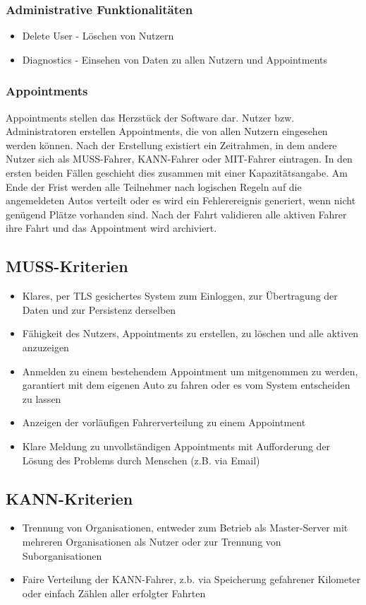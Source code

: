 \documentclass[11pt,a4paper]{article}
\begin{document}
\subsubsection{Administrative Funktionalitäten}
\begin{itemize}
\item Delete User - Löschen von Nutzern
\item Diagnostics - Einsehen von Daten zu allen Nutzern und Appointments
\end{itemize}
\subsubsection{Appointments}
Appointments stellen das Herzstück der Software dar. Nutzer bzw. Administratoren erstellen Appointments, die von allen Nutzern eingesehen werden können. Nach der Erstellung existiert ein Zeitrahmen, in dem andere Nutzer sich als MUSS-Fahrer, KANN-Fahrer oder MIT-Fahrer eintragen. In den ersten beiden Fällen geschieht dies zusammen mit einer Kapazitätsangabe.
Am Ende der Frist werden alle Teilnehmer nach logischen Regeln auf die angemeldeten Autos verteilt oder es wird ein Fehlerereignis generiert, wenn nicht genügend Plätze vorhanden sind.
Nach der Fahrt validieren alle aktiven Fahrer ihre Fahrt und das Appointment wird archiviert.
\subsection{MUSS-Kriterien}
\begin{itemize}
\item Klares, per TLS gesichertes System zum Einloggen, zur Übertragung der Daten und zur Persistenz derselben
\item Fähigkeit des Nutzers, Appointments zu erstellen, zu löschen und alle aktiven anzuzeigen
\item Anmelden zu einem bestehendem Appointment um mitgenommen zu werden, garantiert mit dem eigenen Auto zu fahren oder es vom System entscheiden zu lassen
\item Anzeigen der vorläufigen Fahrerverteilung zu einem Appointment
\item Klare Meldung zu unvollständigen Appointments mit Aufforderung der Lösung des Problems durch Menschen (z.B. via Email)
\end{itemize}

\subsection{KANN-Kriterien}
\begin{itemize}
\item Trennung von Organisationen, entweder zum Betrieb als Master-Server mit mehreren Organisationen als Nutzer oder zur Trennung von Suborganisationen
\item Faire Verteilung der KANN-Fahrer, z.b. via Speicherung gefahrener Kilometer oder einfach Zählen aller erfolgter Fahrten
\end{itemize}
\end{document}

